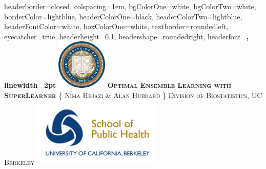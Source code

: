 \documentclass[landscape,a0paper,fontscale=0.285]{baposter} %
\begin{document}
\begin{poster}
{
headerborder=closed, %
colspacing=1em, %
bgColorOne=white, %
bgColorTwo=white, %
borderColor=lightblue, %
headerColorOne=black, %
headerColorTwo=lightblue, %
headerFontColor=white, %
boxColorOne=white, %
textborder=roundedleft, %
eyecatcher=true, %
headerheight=0.1\textheight, %
headershape=roundedright, %
headerfont=\Large\bf\textsc, %
linewidth=2pt %
}
%
{\includegraphics[height=6.5em]{logo_cal.jpg}} %
{\bf\textsc{Optimal Ensemble Learning with SuperLearner}\vspace{0.5em}} %
{\textsc{\{ Nima Hejazi \& Alan Hubbard \} \hspace{12pt} Division of
  Biostatistics, UC Berkeley}} %
{\includegraphics[height=9em]{logo_sph.jpg}} %


\end{poster}
\end{document}
